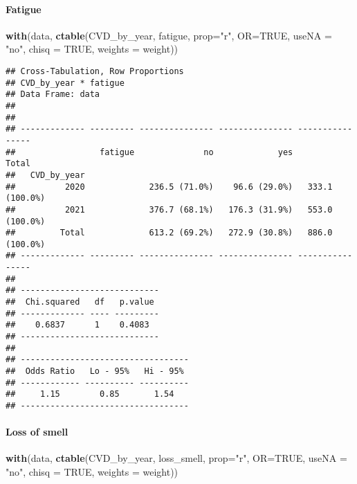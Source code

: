\documentclass[
]{article}
\newenvironment{Shaded}{\begin{snugshade}}{\end{snugshade}}
\newcommand{\AttributeTok}[1]{\textcolor[rgb]{0.13,0.29,0.53}{#1}}
\newcommand{\ConstantTok}[1]{\textcolor[rgb]{0.56,0.35,0.01}{#1}}
\newcommand{\FunctionTok}[1]{\textcolor[rgb]{0.13,0.29,0.53}{\textbf{#1}}}
\newcommand{\NormalTok}[1]{#1}
\newcommand{\StringTok}[1]{\textcolor[rgb]{0.31,0.60,0.02}{#1}}
\begin{document}
\hypertarget{fatigue-1}{%
\paragraph{\texorpdfstring{{ Fatigue }}{ Fatigue }}\label{fatigue-1}}

\begin{Shaded}
\begin{Highlighting}[]
\FunctionTok{with}\NormalTok{(data, }\FunctionTok{ctable}\NormalTok{(CVD\_by\_year, fatigue, }\AttributeTok{prop=}\StringTok{"r"}\NormalTok{, }\AttributeTok{OR=}\ConstantTok{TRUE}\NormalTok{, }\AttributeTok{useNA =} \StringTok{"no"}\NormalTok{, }\AttributeTok{chisq =} \ConstantTok{TRUE}\NormalTok{, }\AttributeTok{weights =}\NormalTok{ weight))}
\end{Highlighting}
\end{Shaded}

\begin{verbatim}
## Cross-Tabulation, Row Proportions  
## CVD_by_year * fatigue  
## Data Frame: data  
## 
## 
## ------------- --------- --------------- --------------- ----------------
##                 fatigue              no             yes            Total
##   CVD_by_year                                                           
##          2020             236.5 (71.0%)    96.6 (29.0%)   333.1 (100.0%)
##          2021             376.7 (68.1%)   176.3 (31.9%)   553.0 (100.0%)
##         Total             613.2 (69.2%)   272.9 (30.8%)   886.0 (100.0%)
## ------------- --------- --------------- --------------- ----------------
## 
## ----------------------------
##  Chi.squared   df   p.value 
## ------------- ---- ---------
##    0.6837      1    0.4083  
## ----------------------------
## 
## ----------------------------------
##  Odds Ratio   Lo - 95%   Hi - 95% 
## ------------ ---------- ----------
##     1.15        0.85       1.54   
## ----------------------------------
\end{verbatim}

\hypertarget{loss-of-smell-1}{%
\paragraph{\texorpdfstring{{ Loss of smell
}}{ Loss of smell }}\label{loss-of-smell-1}}

\begin{Shaded}
\begin{Highlighting}[]
\FunctionTok{with}\NormalTok{(data, }\FunctionTok{ctable}\NormalTok{(CVD\_by\_year, loss\_smell, }\AttributeTok{prop=}\StringTok{"r"}\NormalTok{, }\AttributeTok{OR=}\ConstantTok{TRUE}\NormalTok{, }\AttributeTok{useNA =} \StringTok{"no"}\NormalTok{, }\AttributeTok{chisq =} \ConstantTok{TRUE}\NormalTok{, }\AttributeTok{weights =}\NormalTok{ weight))}
\end{Highlighting}
\end{Shaded}
\end{document}
